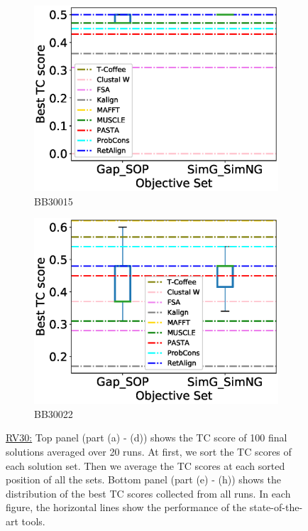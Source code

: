 \begin{figure}[!htbp]
\begin{adjustwidth}{-1cm}{-1cm}
\begin{subfigure}{0.22\textwidth}
			\includegraphics[width=\columnwidth]{Figure/summary/precomputedInit/Balibase/BB30015_objset_tc_rank_2}
			\caption{BB30015}
		\end{subfigure}
		\begin{subfigure}{0.22\textwidth}
			\includegraphics[width=\columnwidth]{Figure/summary/precomputedInit/Balibase/BB30022_objset_tc_rank_2}
			\caption{BB30022}
		\end{subfigure}
		\end{adjustwidth}
		\caption[TC score results on RV30]{\underline{RV30:} Top panel (part (a) - (d)) shows the TC score of 100 final solutions averaged over 20 runs. At first, we sort the TC scores of each solution set. Then we average the TC scores at each sorted position of all the sets. Bottom panel (part (e) - (h)) shows the distribution of the best TC scores collected from all runs. In each figure, the horizontal lines show the performance of the state-of-the-art tools.}
		\label{fig:rv30_tc}

\end{figure}

